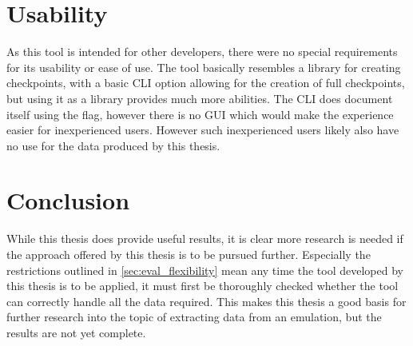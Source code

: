 \section{Usability}
As this tool is intended for other developers,
there were no special requirements for its usability or ease of use.
The tool basically resembles a library for creating checkpoints,
with a basic CLI option allowing for the creation of full checkpoints,
but using it as a library provides much more abilities.
The CLI does document itself using the  flag,
however there is no GUI which would make the experience easier for inexperienced users.
However such inexperienced users likely also have no use for the data produced by this thesis.

\section{Conclusion}
While this thesis does provide useful results,
it is clear more research is needed if the approach offered by this thesis is to be pursued further.
Especially the restrictions outlined in \autoref{sec:eval_flexibility}
mean any time the tool developed by this thesis is to be applied,
it must first be thoroughly checked whether the tool can correctly handle all the data required.
This makes this thesis a good basis for further research into the topic of extracting data from an emulation,
but the results are not yet complete.